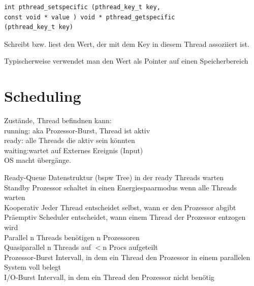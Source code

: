 \begin{multicols*}{5}
	\vspace{-5pt}


	\begin{lstlisting}
int pthread_setspecific (pthread_key_t key,
const void * value ) void * pthread_getspecific 
(pthread_key_t key)
	\end{lstlisting}
	\vspace{-5pt}
		\begin{compactitem}[$\bullet$]
			\item Schreibt bzw. liest den Wert, der mit dem Key in diesem Thread assoziiert ist. 
			\item Typischerweise verwendet man den Wert als Pointer auf einen Speicherbereich
		\end{compactitem}
				


\section{Scheduling}
	Zustände, Thread befindnen kann:\\
	\textcolor{h}{running:} aka Prozessor-Burst, Thread ist aktiv\\
	\textcolor{h}{ready:} alle Threads die aktiv sein könnten\\
	\textcolor{h}{waiting:}wartet auf Externes Ereignis (Input)\\
	OS macht übergänge.
	
	\vspace{-2pt}
	\drule{\linewidth}{1pt}

	\textcolor{h}{Ready-Queue} Datenstruktur (bspw Tree) in der ready Threads warten\\
	\textcolor{h}{Standby} Prozessor schaltet in einen Energiespaarmodus wenn alle Threads warten\\
	\textcolor{h}{Kooperativ} Jeder Thread entscheidet	selbst, wann er den Prozessor abgibt\\
	\textcolor{h}{Präemptiv} Scheduler entscheidet, wann einem Thread der Prozessor entzogen wird\\
	\textcolor{h}{Parallel} n Threads benötigen n Prozessoren\\
	\textcolor{h}{Quasiparallel} n Threads auf $<$n Procs aufgeteilt\\
	\textcolor{h}{Prozessor-Burst} Intervall, in dem ein Thread den Prozessor in einem parallelen System voll belegt\\
	\textcolor{h}{I/O-Burst} Intervall, in dem ein Thread den Prozessor nicht benötig\\


\end{multicols*}
